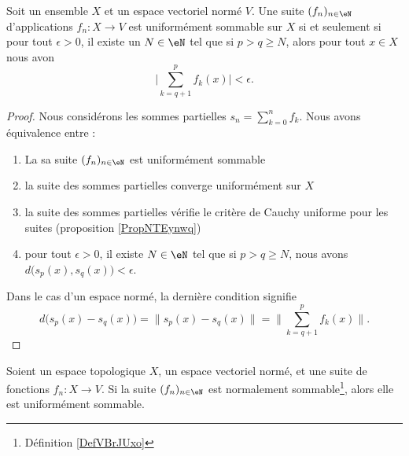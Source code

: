 \begin{proposition}	\label{PROPooEBYWooOXUwry}
	Soit un ensemble \( X\) et un espace vectoriel normé \( V\). Une suite \( (f_n)_{n\in \eN}\) d'applications \(f_n \colon X\to V  \) est uniformément sommable sur \( X\) si et seulement si pour tout \( \epsilon>0\), il existe un \( N\in \eN\) tel que si \( p>q\geq N\), alors pour tout \( x\in X\) nous avon
	\begin{equation}
		\big| \sum_{k=q+1}^pf_k(x) \big|<\epsilon.
	\end{equation}
\end{proposition}

\begin{proof}
	Nous considérons les sommes partielles \( s_n=\sum_{k=0}^nf_k\). Nous avons équivalence entre :
	\begin{enumerate}
		\item
		      La sa suite \( (f_n)_{n\in \eN}\) est uniformément sommable
		\item
		      la suite des sommes partielles converge uniformément sur \( X\)
		\item
		      la suite des sommes partielles vérifie le critère de Cauchy uniforme pour les suites (proposition \ref{PropNTEynwq})
		\item
		      pour tout \( \epsilon>0\), il existe \( N\in \eN\) tel que si \( p>q\geq N\), nous avons \( d\big( s_p(x),s_q(x) \big)<\epsilon\).
	\end{enumerate}
	Dans le cas d'un espace normé, la dernière condition signifie
	\begin{equation}
		d\big( s_p(x)-s_q(x) \big)=\| s_p(x)-s_q(x) \|=\| \sum_{k=q+1}^pf_k(x) \|.
	\end{equation}
\end{proof}


\begin{lemma}       \label{LEMooJZTBooIopLok}
	Soient un espace topologique \( X\), un espace vectoriel normé, et une suite de fonctions \( f_n\colon X\to V\). Si la suite \( (f_n)_{n\in \eN}\) est normalement sommable\footnote{Définition \ref{DefVBrJUxo}}, alors elle est uniformément sommable.
\end{lemma}

